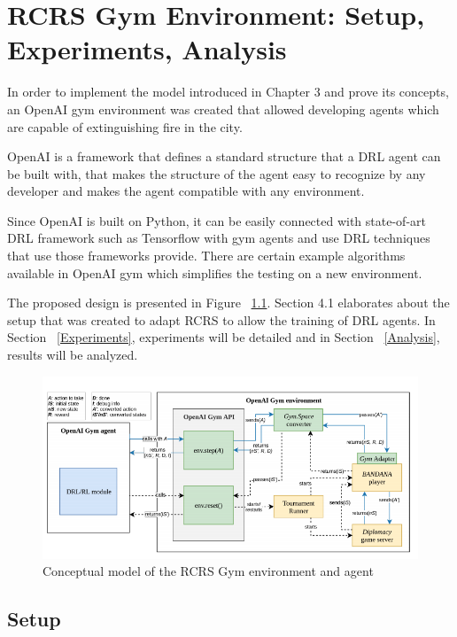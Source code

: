 \documentclass[12pt]{report}
\begin{document}
\chapter{RCRS Gym Environment: Setup, Experiments, Analysis}

In order to implement the model introduced in Chapter 3 and prove its concepts, an OpenAI gym environment \cite{brockman2016openai} was created that allowed developing agents which are capable of extinguishing fire in the city. 

OpenAI is a framework that defines a standard structure that a DRL agent can be built with, that makes the structure of the agent easy to recognize by any developer and makes the agent compatible with any environment. 

Since OpenAI is built on Python, it can be easily connected with state-of-art DRL framework such as Tensorflow \cite{Abadi} with gym agents and use DRL techniques that use those frameworks provide. There are certain example algorithms available in OpenAI gym which simplifies the testing on a new environment. 

The proposed design is presented in Figure ~\ref{fig:OpenAIgymRCRS}. Section 4.1 elaborates about the setup that was created to adapt RCRS to allow the training of DRL agents. In Section ~\ref{Experiments}, experiments will be detailed and in Section ~\ref{Analysis}, results will be analyzed. 

\begin{figure}[!h]
    \centering
    \includegraphics[width=14cm]{OpenAIgymRCRS.png}
    \caption{Conceptual model of the RCRS Gym environment and agent}
    \label{fig:OpenAIgymRCRS}
\end{figure}

\section{Setup} \label{Setup}
\end{document}

